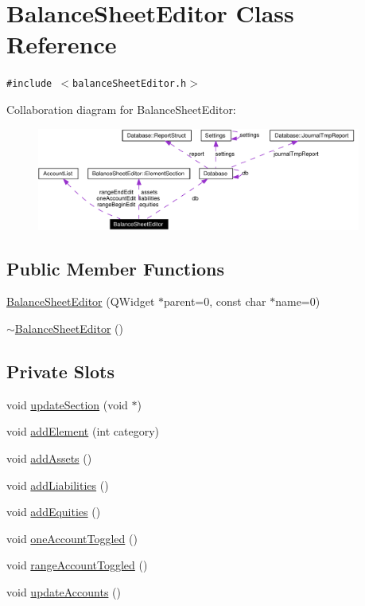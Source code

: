 \hypertarget{classBalanceSheetEditor}{
\section{Balance\-Sheet\-Editor Class Reference}
\label{classBalanceSheetEditor}
}
{\tt \#include $<$balance\-Sheet\-Editor.h$>$}

Collaboration diagram for Balance\-Sheet\-Editor:\begin{figure}[H]
\begin{center}
\leavevmode
\includegraphics[width=302pt]{classBalanceSheetEditor__coll__graph}
\end{center}
\end{figure}
\subsection*{Public Member Functions}
\begin{CompactItemize}
\item 
\hyperlink{classBalanceSheetEditor_a0}{Balance\-Sheet\-Editor} (QWidget $\ast$parent=0, const char $\ast$name=0)
\item 
\hyperlink{classBalanceSheetEditor_a1}{$\sim$Balance\-Sheet\-Editor} ()
\end{CompactItemize}
\subsection*{Private Slots}
\begin{CompactItemize}
\item 
void \hyperlink{classBalanceSheetEditor_k0}{update\-Section} (void $\ast$)
\item 
void \hyperlink{classBalanceSheetEditor_k1}{add\-Element} (int category)
\item 
void \hyperlink{classBalanceSheetEditor_k2}{add\-Assets} ()
\item 
void \hyperlink{classBalanceSheetEditor_k3}{add\-Liabilities} ()
\item 
void \hyperlink{classBalanceSheetEditor_k4}{add\-Equities} ()
\item 
void \hyperlink{classBalanceSheetEditor_k5}{one\-Account\-Toggled} ()
\item 
void \hyperlink{classBalanceSheetEditor_k6}{range\-Account\-Toggled} ()
\item 
void \hyperlink{classBalanceSheetEditor_k7}{update\-Accounts} ()
\end{CompactItemize}
